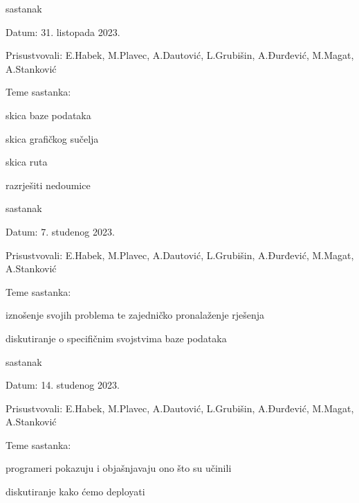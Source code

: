 \begin{packed_enum}
			\item  sastanak
			\item[] \begin{packed_item}
				\item Datum: 31. listopada 2023.
				\item Prisustvovali: E.Habek, M.Plavec, A.Dautović, L.Grubišin, A.Đurđević, M.Magat, A.Stanković
				\item Teme sastanka:
				\begin{packed_item}
					\item skica baze podataka
					\item skica grafičkog sučelja
					\item skica ruta
					\item razrješiti nedoumice
				\end{packed_item}
			\end{packed_item}

			\item  sastanak
			\item[] \begin{packed_item}
				\item Datum: 7. studenog 2023.
				\item Prisustvovali: E.Habek, M.Plavec, A.Dautović, L.Grubišin, A.Đurđević, M.Magat, A.Stanković
				\item Teme sastanka:
				\begin{packed_item}
					\item iznošenje svojih problema te zajedničko pronalaženje rješenja
					\item diskutiranje o specifičnim svojstvima baze podataka
				\end{packed_item}
			\end{packed_item}

			\item  sastanak
			\item[] \begin{packed_item}
				\item Datum: 14. studenog 2023.
				\item Prisustvovali: E.Habek, M.Plavec, A.Dautović, L.Grubišin, A.Đurđević, M.Magat, A.Stanković
				\item Teme sastanka:
				\begin{packed_item}
					\item programeri pokazuju i objašnjavaju ono što su učinili
					\item diskutiranje kako ćemo deployati
				\end{packed_item}
			\end{packed_item}


\end{packed_enum}
